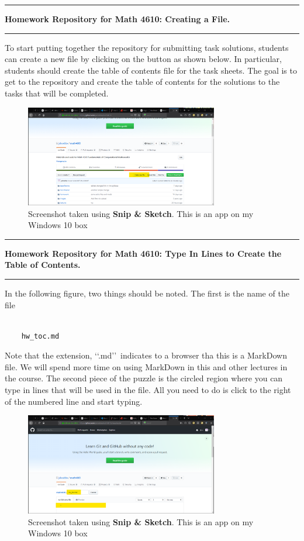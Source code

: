 \documentclass[10pt,fleqn]{article}
\begin{document}
\eject
\vskip0.1in\hrule\vskip0.1in
\noindent
{\bf Homework Repository for Math 4610: Creating a File.} 
\vskip0.1in\hrule\vskip0.1in
To start putting together the repository for submitting task solutions, students
can create a new file by clicking on the button as shown below. In particular,
students should create the table of contents file for the task sheets. The goal
is to get to the repository and create the table of contents for the solutions
to the tasks that will be completed.
\vfill
\begin{figure}[h]
\centering
\includegraphics[width=0.75\textwidth]{../images/github_04.png}
\caption{{Screenshot} taken using {\bf Snip \& Sketch}. This is an app on
         my Windows 10 box}
\end{figure}
\eject
\vskip0.1in\hrule\vskip0.1in
\noindent
{\bf Homework Repository for Math 4610: Type In Lines to Create the Table of
Contents.} 
\vskip0.1in\hrule\vskip0.1in
In the following figure, two things should be noted. The first is the name of
the file
\begin{verbatim}

    hw_toc.md

\end{verbatim}
Note that the extension, \lq\lq .md\rq\rq\ indicates to a browser tha this is a
MarkDown file. We will spend more time on using MarkDown in this and other
lectures in the course. The second piece of the puzzle is the circled region
where you can type in lines that will be used in the file. All you need to do is
click to the right of the numbered line and start typing.
\vfill
\begin{figure}[h]
\centering
\includegraphics[width=0.75\textwidth]{../images/github_05.png}
\caption{{Screenshot} taken using {\bf Snip \& Sketch}. This is an app on
         my Windows 10 box}
\end{figure}
\end{document}
